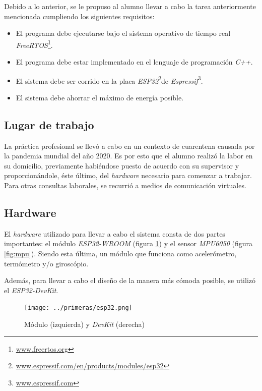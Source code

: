 \documentclass{article}
\newcommand{ \fnfreertos }{\footnote{\url{www.freertos.org}}}
\newcommand{ \fnespressif }{\footnote{\url{www.espressif.com}}}
\newcommand{ \fnesp }{\footnote{\url{www.espressif.com/en/products/modules/esp32}}}
\begin{document}
    Debido a lo anterior, se le propuso al alumno llevar a cabo la tarea 
    anteriormente mencionada cumpliendo los siguientes requisitos:

    \begin{itemize}
        \item El programa debe ejecutarse bajo el sistema operativo de tiempo
        real \emph{FreeRTOS}\fnfreertos.
        \item El programa debe estar implementado en el lenguaje de 
        programación \emph{C++}.
        \item El sistema debe ser corrido en la placa \emph{ESP32}\fnesp de 
        \emph{Espressif}\fnespressif.
        \item El sistema debe ahorrar el máximo de energía posible.
    \end{itemize}
    
    \subsection{Lugar de trabajo}
    La práctica profesional se llevó a cabo en un contexto de cuarentena causada 
    por la pandemia mundial del año 2020. Es por esto que el alumno realizó la 
    labor en su domicilio, previamente habiéndose puesto de acuerdo con su 
    supervisor y proporcionándole, éste último, del \emph{hardware} necesario 
    para comenzar a trabajar. Para otras consultas laborales, se recurrió a 
    medios de comunicación virtuales.

    \subsection{Hardware}
    El \emph{hardware} utilizado para llevar a cabo el sistema consta de dos 
    partes importantes: el módulo \emph{ESP32-WROOM} (figura \ref{fig:esp32})
    y el sensor \emph{MPU6050} (figura \ref{fig:mpu}). Siendo esta última, 
    un módulo que funciona como acelerómetro, termómetro y/o giroscópio. \par

    Además, para llevar a cabo el diseño de la manera más cómoda posible, se
    utilizó el \emph{ESP32-DevKit}.

    \begin{figure}[h]
        \texttt{[image: ../primeras/esp32.png]}
        \caption{Módulo (izquierda) y \emph{DevKit} (derecha)}
        \label{fig:esp32}
    \end{figure} 
\end{document}

